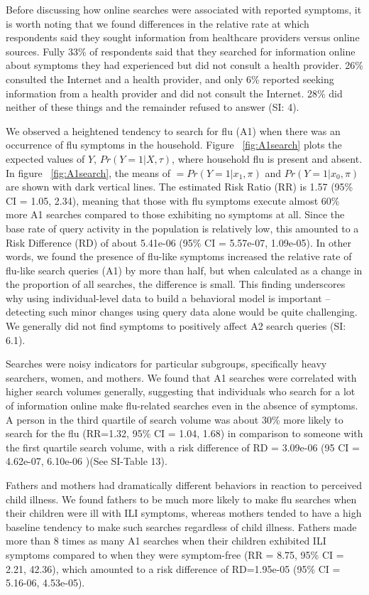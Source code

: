 \documentclass[fleqn,10pt]{wlscirep}
\begin{document}
Before discussing how online searches were associated with reported symptoms, it is worth noting that we found differences in the relative rate at which respondents said they sought information from healthcare providers versus online sources. Fully 33\% of respondents said that they searched for information online about symptoms they had experienced but did not consult a health provider. 26\% consulted the Internet and a health provider, and only 6\% reported seeking information from a health provider and did not consult the Internet. 28\% did neither of these things and the remainder refused to answer (SI: 4). 

We observed a heightened tendency to search for flu (A1) when there was an occurrence of flu symptoms in the household. Figure ~\ref{fig:A1search} plots the expected values of $Y$, $Pr(Y=1|X, \tau)$, where household flu is present and absent. In figure ~\ref{fig:A1search}, the means of $ = Pr(Y=1|x_1, \pi)$ and $ Pr(Y=1|x_0, \pi) $ are shown with dark vertical lines. The estimated Risk Ratio (RR) is 1.57 (95\% CI = 1.05, 2.34), meaning that those with flu symptoms execute almost 60\% more A1 searches compared to those exhibiting no symptoms at all. Since the base rate of query activity in the population is relatively low, this amounted to a Risk Difference (RD) of about 5.41e-06 (95\% CI = 5.57e-07, 1.09e-05). In other words, we found the presence of flu-like symptoms increased the relative rate of flu-like search queries (A1) by more than half, but when calculated as a change in the proportion of all searches, the difference is small. This finding underscores why using individual-level data to build a behavioral model is important -- detecting such minor changes using query data alone would be quite challenging. We generally did not find symptoms to positively affect A2 search queries (SI: 6.1).

Searches were noisy indicators for particular subgroups, specifically heavy searchers, women, and mothers. We found that A1 searches were correlated with higher search volumes generally, suggesting that individuals who search for a lot of information online make flu-related searches even in the absence of symptoms. A person in the third quartile of search volume was about 30\% more likely to search for the flu (RR=1.32, 95\% CI = 1.04, 1.68) in comparison to someone with the first quartile search volume, with a risk difference of RD = 3.09e-06 (95 CI = 4.62e-07, 6.10e-06 )(See SI-Table 13). 

Fathers and mothers had dramatically different behaviors in reaction to perceived child illness. We found fathers to be much more likely to make flu searches when their children were ill with ILI symptoms, whereas mothers tended to have a high baseline tendency to make such searches regardless of child illness. Fathers made more than 8 times as many A1 searches when their children exhibited ILI symptoms compared to when they were symptom-free (RR = 8.75, 95\% CI = 2.21, 42.36), which amounted to a risk difference of RD=1.95e-05 (95\% CI = 5.16-06, 4.53e-05).
\end{document}
